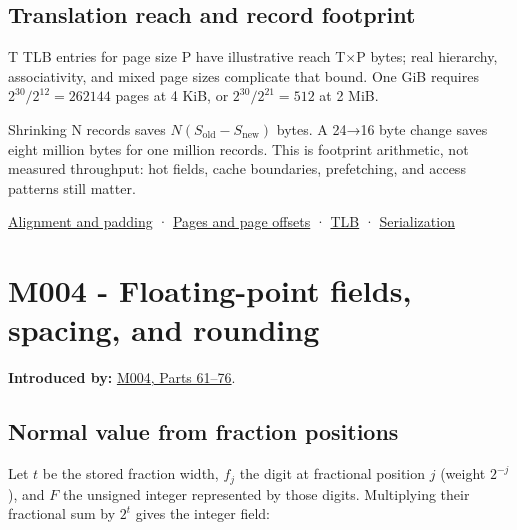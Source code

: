 \subsection{Translation reach and record footprint}\label{01-foundations-i-ch011-translation-reach-and-record-footprint}

\hypertarget{01-foundations-i-ch011-translation-reach-and-record-footprint}{}

T TLB entries for page size P have illustrative reach T×P bytes; real hierarchy, associativity, and mixed page sizes complicate that bound. One GiB requires \(2^{30}/2^{12}=262144\) pages at 4 KiB, or \(2^{30}/2^{21}=512\) at 2 MiB.

Shrinking N records saves \(N(S_{\mathrm{old}}-S_{\mathrm{new}})\) bytes. A 24→16 byte change saves eight million bytes for one million records. This is footprint arithmetic, not measured throughput: hot fields, cache boundaries, prefetching, and access patterns still matter.

\hyperref[appendix-a1f7c53b4742]{Alignment and padding} · \hyperref[appendix-0c67cd5bf30a]{Pages and page offsets} · \hyperref[appendix-7a2d9c5ce511]{TLB} · \hyperref[appendix-91d09ebed979]{Serialization}

\section{M004 - Floating-point fields, spacing, and rounding}\label{01-foundations-i-ch011-m004---floating-point-fields-spacing-and-rounding}

\hypertarget{01-foundations-i-ch011-m004---floating-point-fields-spacing-and-rounding}{}

\textbf{Introduced by:} \hyperref[01-foundations-i-ch001-a-stretching-ruler-for-real-valued-quantities]{M004, Parts 61--76}.

\subsection{Normal value from fraction positions}\label{01-foundations-i-ch011-normal-value-from-fraction-positions}

\hypertarget{01-foundations-i-ch011-normal-value-from-fraction-positions}{}

Let \(t\) be the stored fraction width, \(f_j\) the digit at fractional position \(j\) (weight \(2^{-j}\)), and \(F\) the unsigned integer represented by those digits. Multiplying their fractional sum by \(2^t\) gives the integer field:

